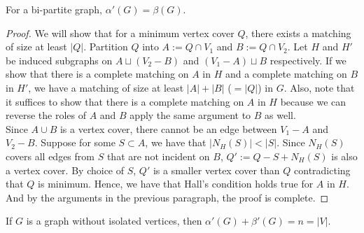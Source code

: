 \documentclass[../basic_graph_theory.tex]{subfiles}
\begin{document}
\begin{thm} 
    For a bi-partite graph, $\alpha'(G) = \beta(G)$. 	
\end{thm}
\begin{proof}
        We will show that for a minimum vertex cover $Q$, there exists a matching of size at least $|Q|$. Partition $Q$ into $A := Q \cap V_1$ and $B := Q \cap V_2$. Let $H$ and $H'$ be induced subgraphs on $A \sqcup (V_2 - B)$ and $(V_1 - A) \sqcup B$ respectively. If we show that there is a complete matching on $A$ in $H$ and a complete matching on $B$ in $H'$, we have a matching of size at least $|A| + |B|$ ($= |Q|$) in $G$.  Also, note that it suffices to show that there is a complete matching on $A$ in $H$ because we can reverse the roles of $A$ and $B$ apply the same argument to $B$ as well. \\
        Since $A \cup B$ is a vertex cover, there cannot be an edge between $V_1 - A$ and $V_2 - B$. Suppose for some $S \subset A$, we have that $|N_H(S)| < |S|$. Since $N_H(S)$ covers all edges from $S$ that are not incident on $B$, $Q' := Q - S + N_H(S)$ is also a vertex cover. By choice of $S$, $Q'$ is a smaller vertex cover than $Q$ contradicting that $Q$ is minimum.  Hence, we have that Hall's condition holds true for $A$ in $H$. And by the arguments in the previous paragraph, the proof is complete. 
\end{proof}
\begin{thm}[Gallai, 1959] 
    If $G$ is a graph without isolated vertices, then $\alpha'(G) + \beta'(G) = n = |V|.$	
\end{thm}
\end{document}
